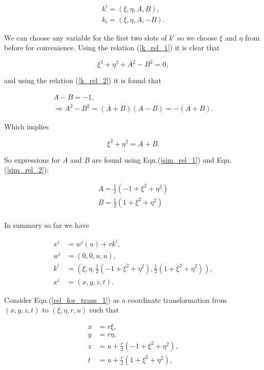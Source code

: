 \begin{gather*}
k^i = (\xi, \eta, A, B), \\
k_i = (\xi, \eta, A, -B).
\end{gather*}

\noindent We can choose any variable for the first two slots of $k^i$ so we choose $\xi$ and $\eta$ from before for convenience. Using the relation (\ref{k_rel_1}) it is clear that

\begin{equation*}
\xi^2 + \eta^2 + A^2 - B^2 = 0,
\end{equation*}

\noindent and using the relation (\ref{k_rel_2}) it is found that

\begin{gather}
A - B = -1 \label{sim_rel_1},\\
\Rightarrow A^2 - B^2 = (A + B)(A - B) = - (A + B).
\end{gather}

\noindent Which implies

\begin{equation}\label{sim_rel_2}
\xi^2 + \eta^2 = A + B. 
\end{equation}

\noindent So expressions for $A$ and $B$ are found using Eqn.(\ref{sim_rel_1}) and Eqn.(\ref{sim_rel_2}):

\begin{eqnarray*}
A = \frac{1}{2} (-1 + \xi^2 + \eta^2) \\
B = \frac{1}{2} (1 + \xi^2 + \eta^2) \\
\end{eqnarray*}

In summary so far we have

\begin{align}
x^i & = w^i (u) + r k^i \label{rel_for_trans_1},\\
w^i & = (0,0, u,u) \label{rel_for_trans_2},\\
k^i & = (\xi, \eta, \frac{1}{2} (-1 + \xi^2 + \eta^2), \frac{1}{2} (1 + \xi^2 + \eta^2)) \label{rel_for_trans_3},\\
x^i & = (x, y, z, t) \label{rel_for_trans_4}.  
\end{align}

Consider Eqn.(\ref{rel_for_trans_1}) as a coordinate transformation from $(x,y,z,t)$ to $(\xi,\eta, r, u )$ such that

\begin{align}
x & = r \xi, \nonumber \\
y & = r \eta, \nonumber \\
z & = u + \frac{r}{2} (-1 + \xi^2 + \eta^2), \nonumber \\
t & = u + \frac{r}{2} (1 + \xi^2 + \eta^2),  \label{trans_x_to_xi} 
\end{align} 


